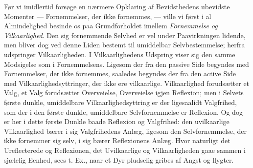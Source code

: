 \documentclass[11pt]{book}
\newcommand{\opage}[1]{\marginnote{\footnotesize\textit{[#1]}}}
\begin{document}
Før vi imidlertid forsøge en nærmere Opklaring af Bevidsthedens ubevidste
Momenter --- Fornemmelser, der ikke fornemmes, --- ville vi først i al
Almindelighed besinde os paa Grundforholdet imellem \emph{Fornemmelse og
Vilkaarlighed}. Den sig fornemmende Selvhed er vel under Paavirkningen
lidende, men bliver dog ved denne Liden bestemt
\opage{339} \setcounter{footnote}{0}%
til umiddelbar Selvbestemmelse; herfra udspringer Vilkaarligheden. I
Vilkaarlighedens Udspring viser sig den samme Modsigelse som i
Fornemmelsens. Ligesom der fra den passive Side begyndes med Fornemmelser,
der ikke fornemmes, saaledes begyndes der fra den active Side med
Vilkaarlighedsyttringer, der ikke ere vilkaarlige. Vilkaarlighed forudsætter
et Valg, et Valg forudsætter Overveielse, Overveielse igjen Reflexion; men i
Selvets første dunkle, umiddelbare Vilkaarlighedsyttring er der ligesaalidt
Valgfrihed, som der i den første dunkle, umiddelbare Selvfornemmelse er
Reflexion. Og dog er her i dette første Dunkle baade Reflexion og
Valgfrihed: den uvilkaarlige Vilkaarlighed bærer i sig Valgfrihedens Anlæg,
ligesom den Selvfornemmelse, der ikke fornemmer sig selv, i sig bærer
Reflexionens Anlæg. Hvor naturligt det Ureflecterede og Reflexionen, det
Uvilkaarlige og Vilkaarligheden gaae sammen i sjælelig Eenhed, sees t. Ex.,
naar et Dyr pludselig gribes af Angst og flygter.
\end{document}

